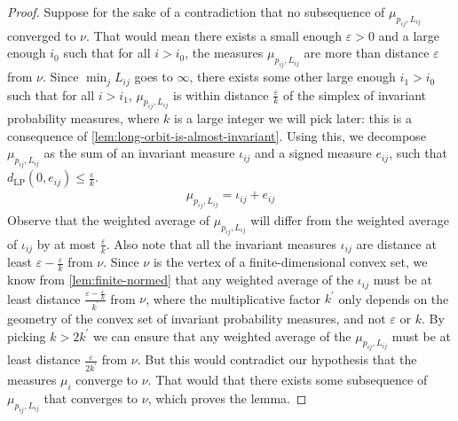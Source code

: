 \documentclass[12pt, reqno]{amsart}
\begin{document}
\begin{proof}
  Suppose for the sake of a contradiction that no subsequence of $\mu_{p_{ij}, L_{ij}}$ converged to $\nu$.
  That would mean there exists a small enough $\varepsilon > 0$ and a large enough $i_0$ such that for all $i > i_0$, the measures $\mu_{p_{ij}, L_{ij}}$ are more than distance $\varepsilon$ from $\nu$.
  Since $\min_{j} L_{ij}$ goes to $\infty$, there exists some other large enough $i_1 > i_0$ such that for all $i > i_1$, $\mu_{p_{ij}, L_{ij}}$ is within distance $\frac{\varepsilon}{k}$ of the simplex of invariant probability measures, where $k$ is a large integer we will pick later: this is a consequence of \autoref{lem:long-orbit-is-almost-invariant}.
  Using this, we decompose $\mu_{p_{ij}, L_{ij}}$ as the sum of an invariant measure $\iota_{ij}$ and a signed measure $e_{ij}$, such that $d_{\mathrm{LP}}(0, e_{ij}) \leq \frac{\varepsilon}{k}$.
  \begin{align*}
    \mu_{p_{ij}, L_{ij}} = \iota_{ij} + e_{ij}
  \end{align*}
  Observe that the weighted average of $\mu_{p_{ij}, L_{ij}}$ will differ from the weighted average of $\iota_{ij}$ by at most $\frac{\varepsilon}{k}$.
  Also note that all the invariant measures $\iota_{ij}$ are distance at least $\varepsilon - \frac{\varepsilon}{k}$ from $\nu$.
  Since $\nu$ is the vertex of a finite-dimensional convex set, we know from \autoref{lem:finite-normed} that any weighted average of the $\iota_{ij}$ must be at least distance $\frac{\varepsilon - \frac{\varepsilon}{k}}{k^{\prime}}$ from $\nu$, where the multiplicative factor $k^{\prime}$ only depends on the geometry of the convex set of invariant probability measures, and not $\varepsilon$ or $k$.
  By picking $k > 2k^{\prime}$ we can ensure that any weighted average of the $\mu_{p_{ij}, L_{ij}}$ must be at least distance $\frac{\varepsilon}{2k^{\prime}}$ from $\nu$.
  But this would contradict our hypothesis that the measures $\mu_i$ converge to $\nu$.
  That would that there exists some subsequence of $\mu_{p_{ij}, L_{ij}}$ that converges to $\nu$, which proves the lemma.
\end{proof}
\end{document}
